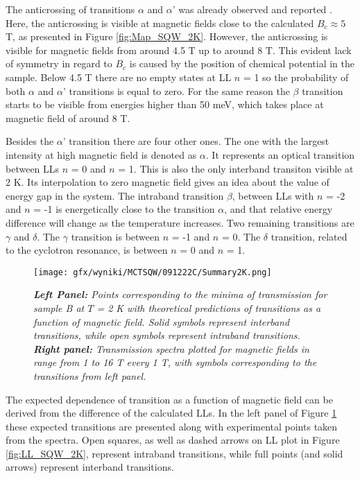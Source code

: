 \documentclass[titlepage,a4paper]{book}
\begin{document}
The anticrossing of transitions $\alpha$ and $\alpha$' was already observed and reported \cite{Orlita_MCT_QW}\cite{Zholudev_MCT_QW}\cite{Zholudev_MCT_QW_anticrossing}. Here, the anticrossing is visible at magnetic fields close to the calculated $B_c \approx 5$ T, as presented in Figure \ref{fig:Map_SQW_2K}. However, the anticrossing is visible for magnetic fields from around 4.5 T up to around 8 T. This evident lack of symmetry in regard to $B_c$ is caused by the position of chemical potential in the sample. Below 4.5 T there are no empty states at LL $n$ = 1 so the probability of both $\alpha$ and $\alpha$' transitions is equal to zero. For the same reason the $\beta$ transition starts to be visible from energies higher than 50 meV, which takes place at magnetic field of around 8 T.

Besides the $\alpha$' transition there are four other ones. The one with the largest intensity at high magnetic field is denoted as $\alpha$. It represents an optical transition between LLs $n$ = 0 and $n$ = 1. This is also the only interband transiton visible at 2 K. Its interpolation to zero magnetic field gives an idea about the value of energy gap in the system. The intraband transition $\beta$, between LLs with $n$ = -2 and $n$ = -1 is energetically close to the transition $\alpha$, and that relative energy difference will change as the temperature increases. Two remaining transitions are $\gamma$ and $\delta$. The $\gamma$ transition is between $n$ = -1 and $n$ = 0. The $\delta$ transition, related to the cyclotron resonance, is between $n$ = 0 and $n$ = 1.

\begin{figure}[ht]
	\centering
	\texttt{[image: gfx/wyniki/MCTSQW/091222C/Summary2K.png]}
	\vspace{-10pt}
	\caption{\textit{\textbf{Left Panel:} Points corresponding to the minima of transmission for sample B at $T$ = 2 K with theoretical predictions of transitions as a function of magnetic field. Solid symbols represent interband transitions, while open symbols represent intraband transitions. \textbf{Right panel:} Transmission spectra plotted for magnetic fields in range from 1 to 16 T every 1 T, with symbols corresponding to the transitions from left panel.}}
	\label{fig:Summary_SQW_2K}
\end{figure}

The expected dependence of transition as a function of magnetic field can be derived from the difference of the calculated LLs. In the left panel of Figure \ref{fig:Summary_SQW_2K} these expected transitions are presented along with experimental points taken from the spectra. Open squares, as well as dashed arrows on LL plot in Figure \ref{fig:LL_SQW_2K}, represent intraband transitions, while full points (and solid arrows) represent interband transitions. 
\end{document}
